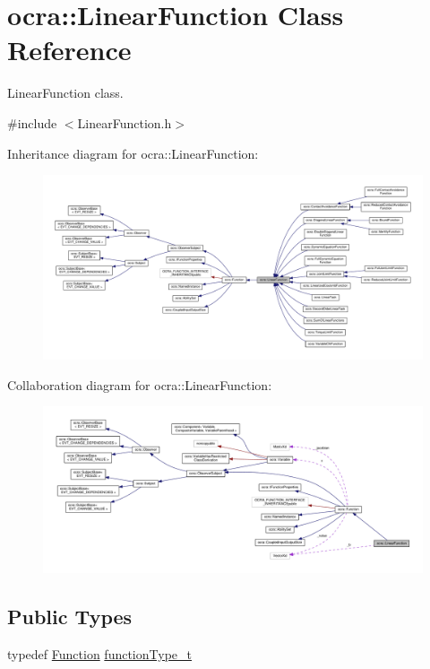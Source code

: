 \hypertarget{classocra_1_1LinearFunction}{}\section{ocra\+:\+:Linear\+Function Class Reference}
\label{classocra_1_1LinearFunction}


Linear\+Function class.  




{\ttfamily \#include $<$Linear\+Function.\+h$>$}



Inheritance diagram for ocra\+:\+:Linear\+Function\+:
\nopagebreak
\begin{figure}[H]
\begin{center}
\leavevmode
\includegraphics[width=350pt]{db/d01/classocra_1_1LinearFunction__inherit__graph}
\end{center}
\end{figure}


Collaboration diagram for ocra\+:\+:Linear\+Function\+:
\nopagebreak
\begin{figure}[H]
\begin{center}
\leavevmode
\includegraphics[width=350pt]{dd/d71/classocra_1_1LinearFunction__coll__graph}
\end{center}
\end{figure}
\subsection*{Public Types}
\begin{DoxyCompactItemize}
\item 
typedef \hyperlink{classocra_1_1Function}{Function} \hyperlink{classocra_1_1LinearFunction_adaf7f13c522f2001ced48c64a361c2e6}{function\+Type\+\_\+t}
\end{DoxyCompactItemize}
